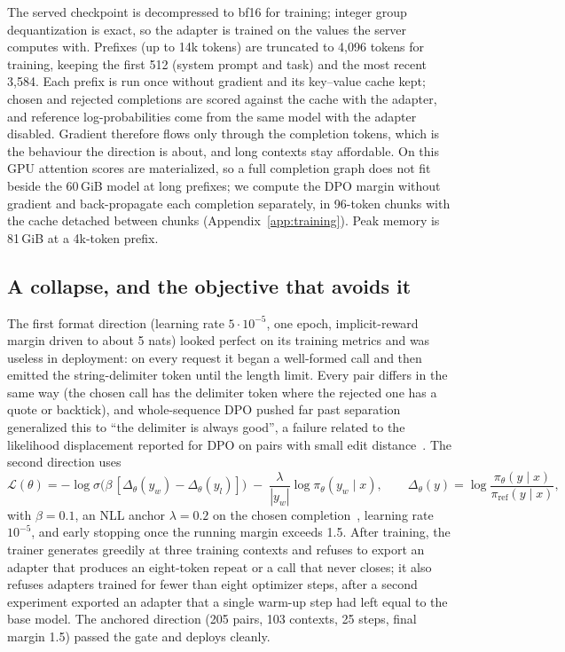 \documentclass[11pt]{article}
\begin{document}
The served checkpoint is decompressed to bf16 for training; integer group dequantization is exact, so the adapter is trained on the values the server computes with. Prefixes (up to 14k tokens) are truncated to 4,096 tokens for training, keeping the first 512 (system prompt and task) and the most recent 3,584. Each prefix is run once without gradient and its key--value cache kept; chosen and rejected completions are scored against the cache with the adapter, and reference log-probabilities come from the same model with the adapter disabled. Gradient therefore flows only through the completion tokens, which is the behaviour the direction is about, and long contexts stay affordable. On this GPU attention scores are materialized, so a full completion graph does not fit beside the 60\,GiB model at long prefixes; we compute the DPO margin without gradient and back-propagate each completion separately, in 96-token chunks with the cache detached between chunks (Appendix~\ref{app:training}). Peak memory is 81\,GiB at a 4k-token prefix.

\subsection{A collapse, and the objective that avoids it}\label{sec:collapse}

The first format direction (learning rate $5\cdot 10^{-5}$, one epoch, implicit-reward margin driven to about 5 nats) looked perfect on its training metrics and was useless in deployment: on every request it began a well-formed call and then emitted the string-delimiter token until the length limit. Every pair differs in the same way (the chosen call has the delimiter token where the rejected one has a quote or backtick), and whole-sequence DPO pushed far past separation generalized this to ``the delimiter is always good'', a failure related to the likelihood displacement reported for DPO on pairs with small edit distance~\citep{pal2024smaug,razin2024displacement}. The second direction uses
\begin{equation}
\mathcal{L}(\theta) = -\log\sigma\big(\beta\,[\Delta_\theta(y_w) - \Delta_\theta(y_l)]\big) \;-\; \frac{\lambda}{|y_w|}\log\pi_\theta(y_w\mid x),
\qquad \Delta_\theta(y) = \log\frac{\pi_\theta(y\mid x)}{\pi_\text{ref}(y\mid x)},
\end{equation}
with $\beta = 0.1$, an NLL anchor $\lambda = 0.2$ on the chosen completion~\citep{pang2024irpo}, learning rate $10^{-5}$, and early stopping once the running margin exceeds 1.5. After training, the trainer generates greedily at three training contexts and refuses to export an adapter that produces an eight-token repeat or a call that never closes; it also refuses adapters trained for fewer than eight optimizer steps, after a second experiment exported an adapter that a single warm-up step had left equal to the base model. The anchored direction (205 pairs, 103 contexts, 25 steps, final margin 1.5) passed the gate and deploys cleanly.
\end{document}
